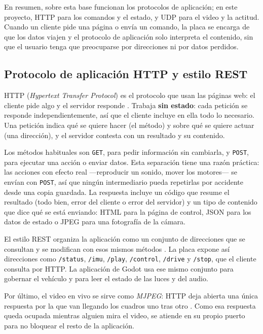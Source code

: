 \documentclass[journal]{IEEEtran}
\begin{document}
En resumen, sobre esta base funcionan los protocolos de aplicación; en este proyecto, HTTP para los comandos y el estado, y UDP para el video y la actitud. Cuando un cliente pide una página o envía un comando, la placa se encarga de que los datos viajen y el protocolo de aplicación solo interpreta el contenido, sin que el usuario tenga que preocuparse por direcciones ni por datos perdidos.

\subsection{Protocolo de aplicación HTTP y estilo REST}

HTTP (\emph{Hypertext Transfer Protocol}) es el protocolo que usan las páginas web: el cliente pide algo y el servidor responde \cite{rfc9110}. Trabaja \textbf{sin estado}: cada petición se responde independientemente, así que el cliente incluye en ella todo lo necesario. Una petición indica qué se quiere hacer (el método) y sobre qué se quiere actuar (una dirección), y el servidor contesta con un resultado y su contenido.

Los métodos habituales son \texttt{GET}, para pedir información sin cambiarla, y \texttt{POST}, para ejecutar una acción o enviar datos. Esta separación tiene una razón práctica: las acciones con efecto real ---reproducir un sonido, mover los motores--- se envían con \texttt{POST}, así que ningún intermediario pueda repetirlas por accidente desde una copia guardada. La respuesta incluye un código que resume el resultado (todo bien, error del cliente o error del servidor) y un tipo de contenido que dice qué se está enviando: HTML para la página de control, JSON para los datos de estado o JPEG para una fotografía de la cámara.

El estilo REST organiza la aplicación como un conjunto de direcciones que se consultan y se modifican con esos mismos métodos \cite{fielding}. La placa expone así direcciones como \texttt{/status}, \texttt{/imu}, \texttt{/play}, \texttt{/control}, \texttt{/drive} y \texttt{/stop}, que el cliente consulta por HTTP. La aplicación de Godot usa ese mismo conjunto para gobernar el vehículo y para leer el estado de las luces y del audio.

Por último, el video en vivo se sirve como \emph{MJPEG}: HTTP deja abierta una única respuesta por la que van llegando los cuadros uno tras otro \cite{rfc2046}. Como esa respuesta queda ocupada mientras alguien mira el video, se atiende en su propio puerto para no bloquear el resto de la aplicación.
\end{document}
